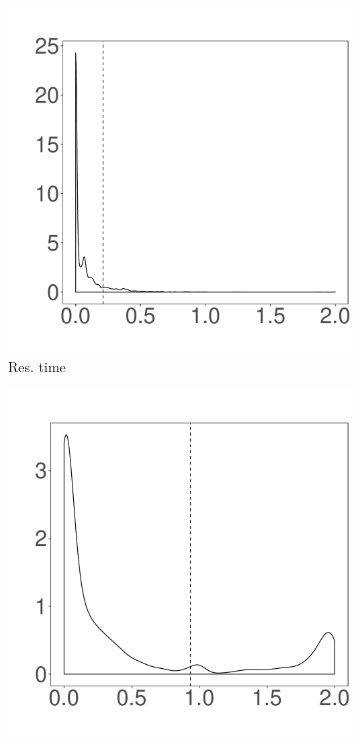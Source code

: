 \documentclass[10pt,journal,compsoc]{IEEEtran}
\begin{document}
\begin{figure}
	\centering
        \begin{subfigure}{0.19\textwidth}
                \includegraphics[width=\linewidth]{Figures/runtime-hadoop-cluster.pdf}
                \caption{Res. time}
        \end{subfigure}%
        \begin{subfigure}{0.19\textwidth}
                \includegraphics[width=\linewidth]{Figures/cpu-hadoop-cluster.pdf}

\end{subfigure}
\end{figure}
\end{document}
